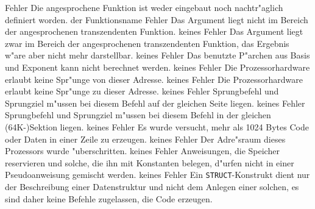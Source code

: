 \documentclass[12pt,a4paper,twoside]{report}
\newcommand{\tty}[1]{{\tt #1}}
\begin{document}
\begin{description}
               {Fehler}
               {Die angesprochene Funktion ist weder eingebaut
                noch nachtr"aglich definiert worden.}
               {der Funktionsname}
               {Fehler}
               {Das Argument liegt nicht im Bereich der
                angesprochenen transzendenten Funktion.}
               {keines}
               {Fehler}
               {Das Argument liegt zwar im Bereich der
                angesprochenen transzendenten Funktion, das Ergebnis
                w"are aber nicht mehr darstellbar.}
               {keines}
               {Fehler}
               {Das benutzte P"archen aus Basis und Exponent
                kann nicht berechnet werden.}
               {keines}
               {Fehler}
               {Die Prozessorhardware erlaubt keine
                Spr"unge von dieser Adresse.}
               {keines}
               {Fehler}
               {Die Prozessorhardware erlaubt keine
                Spr"unge zu dieser Adresse.}
               {keines}
               {Fehler}
               {Sprungbefehl und Sprungziel m"ussen bei diesem
                Befehl auf der gleichen Seite liegen.}
               {keines}
               {Fehler}
               {Sprungbefehl und Sprungziel m"ussen bei diesem
                Befehl in der gleichen (64K-)Sektion liegen.}
               {keines}
               {Fehler}
               {Es wurde versucht, mehr als 1024 Bytes Code oder
                Daten in einer Zeile zu erzeugen.}
               {keines}
               {Fehler}
               {Der Adre"sraum dieses Prozessors wurde
                "uberschritten.}
               {keines}
               {Fehler}
               {Anweisungen, die Speicher reservieren und solche,
                die ihn mit Konstanten belegen, d"urfen nicht in einer
                Pseudoanweisung gemischt werden.}
               {keines}
               {Fehler}
               {Ein \tty{STRUCT}-Konstrukt dient nur der Beschreibung
                einer Datenstruktur und nicht dem Anlegen einer solchen,
                es sind daher keine Befehle zugelassen, die Code erzeugen.}

\end{description}
\end{document}
